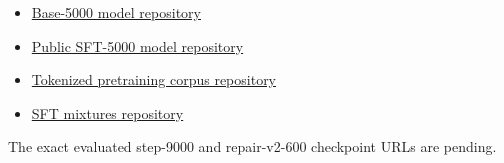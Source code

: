 \documentclass[11pt]{article}
\begin{document}
\begin{itemize}
  \item \href{https://huggingface.co/Ethosoft/nedoqwen_0.8b_base_pretrained}{Base-5000 model repository}
  \item \href{https://huggingface.co/Ethosoft/nedoqwen_0.8b_pretrained_sft}{Public SFT-5000 model repository}
  \item \href{https://huggingface.co/datasets/Ethosoft/nedo-turkish-65k-tokenized-60b}{Tokenized pretraining corpus repository}
  \item \href{https://huggingface.co/datasets/Ethosoft/nedo-turkish-sft-mixtures}{SFT mixtures repository}
\end{itemize}

The exact evaluated step-9000 and repair-v2-600 checkpoint URLs are pending.
\end{document}
